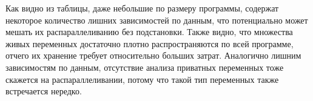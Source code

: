 \documentclass{article}
\begin{document}
Как видно из таблицы, даже небольшие по размеру программы, содержат некоторое количество лишних зависимостей по данным, что потенциально может мешать их распараллеливанию без подстановки.
Также видно, что множества живых переменных достаточно плотно распространяются по всей программе, отчего их хранение требует относительно больших затрат.
Аналогично лишним зависимостям по данным, отсутствие анализа приватных переменных тоже скажется на распараллеливании, потому что такой тип переменных также встречается нередко.


\printbibliography %
\end{document}
